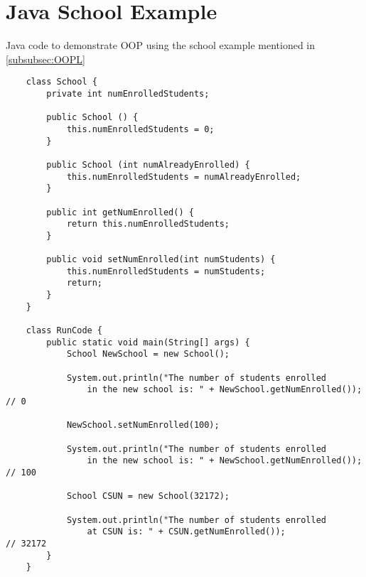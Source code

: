 \section{Java School Example}\label{sec:JavaSchool}

Java code to demonstrate OOP using the school example mentioned in \ref{subsubsec:OOPL}


\begin{verbatim}
    class School {
        private int numEnrolledStudents;
        
        public School () {
            this.numEnrolledStudents = 0;
        }
        
        public School (int numAlreadyEnrolled) {
            this.numEnrolledStudents = numAlreadyEnrolled;
        }
        
        public int getNumEnrolled() {
            return this.numEnrolledStudents;
        }
        
        public void setNumEnrolled(int numStudents) {
            this.numEnrolledStudents = numStudents;
            return;
        }
    }
    
    class RunCode {
        public static void main(String[] args) {
            School NewSchool = new School();
            
            System.out.println("The number of students enrolled 
                in the new school is: " + NewSchool.getNumEnrolled()); // 0
            
            NewSchool.setNumEnrolled(100);
            
            System.out.println("The number of students enrolled
                in the new school is: " + NewSchool.getNumEnrolled()); // 100
            
            School CSUN = new School(32172);
            
            System.out.println("The number of students enrolled
                at CSUN is: " + CSUN.getNumEnrolled());                // 32172
        }
    }
\end{verbatim}